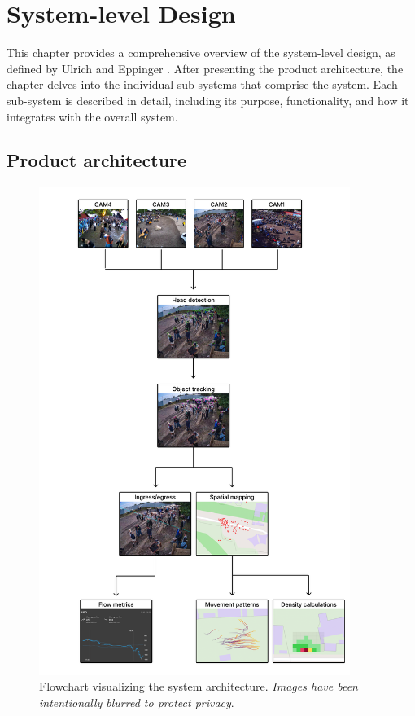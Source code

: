 \chapter{System-level Design}
\label{chap:system-level-design}

This chapter provides a comprehensive overview of the system-level design, as defined by Ulrich and Eppinger \cite{ulrich_eppinger}. After presenting the product architecture, the chapter delves into the individual sub-systems that comprise the system. Each sub-system is described in detail, including its purpose, functionality, and how it integrates with the overall system.

\section{Product architecture}

\begin{figure}[htb!]
  \centering
  \includegraphics[width=0.9\textwidth]{Pictures/Figures/system_flowchart.png}
  \caption{Flowchart visualizing the system architecture. \textit{Images have been intentionally blurred to protect privacy}.}
  \label{fig:system_flowchart}
\end{figure}


